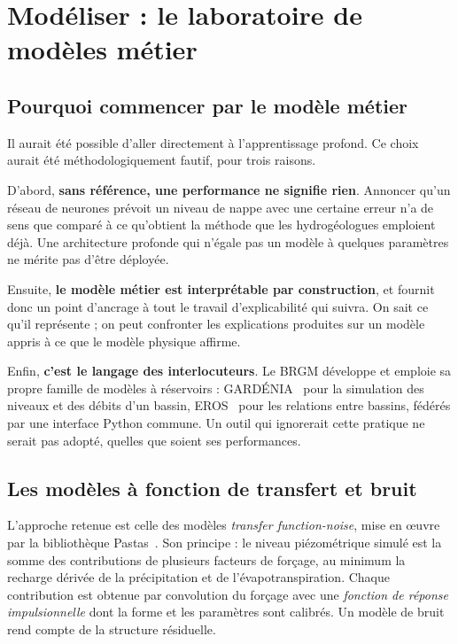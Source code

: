 \chapter{Modéliser : le laboratoire de modèles métier}
\label{ch:metier}


\section{Pourquoi commencer par le modèle métier}

Il aurait été possible d'aller directement à l'apprentissage profond. Ce choix aurait été
méthodologiquement fautif, pour trois raisons.

D'abord, \textbf{sans référence, une performance ne signifie rien}. Annoncer qu'un réseau de
neurones prévoit un niveau de nappe avec une certaine erreur n'a de sens que comparé à ce
qu'obtient la méthode que les hydrogéologues emploient déjà. Une architecture profonde qui
n'égale pas un modèle à quelques paramètres ne mérite pas d'être déployée.

Ensuite, \textbf{le modèle métier est interprétable par construction}, et fournit donc un point
d'ancrage à tout le travail d'explicabilité qui suivra. On sait ce qu'il représente ; on peut
confronter les explications produites sur un modèle appris à ce que le modèle physique affirme.

Enfin, \textbf{c'est le langage des interlocuteurs}. Le BRGM développe et emploie sa propre
famille de modèles à réservoirs : GARDÉNIA~\cite{gardenia} pour la simulation des niveaux et des
débits d'un bassin, EROS~\cite{eros} pour les relations entre bassins, fédérés par une interface
Python commune. Un outil qui ignorerait cette pratique ne serait pas adopté, quelles que soient
ses performances.

\section{Les modèles à fonction de transfert et bruit}

L'approche retenue est celle des modèles \emph{transfer function-noise}, mise en œuvre par la
bibliothèque Pastas~\cite{pastas}. Son principe : le niveau piézométrique simulé est la somme des
contributions de plusieurs facteurs de forçage, au minimum la recharge dérivée de la
précipitation et de l'évapotranspiration. Chaque contribution est obtenue par convolution du
forçage avec une \emph{fonction de réponse impulsionnelle} dont la forme et les paramètres sont
calibrés. Un modèle de bruit rend compte de la structure résiduelle.

